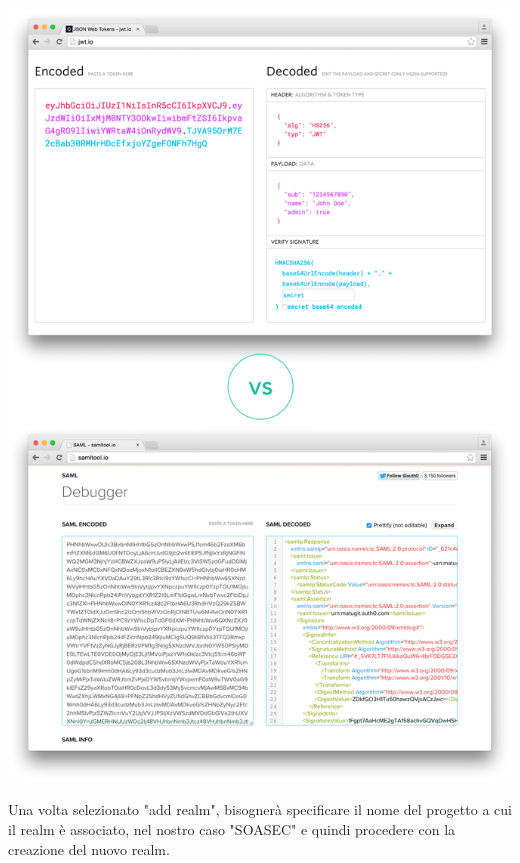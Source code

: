 \documentclass[twoside]{report}
\begin{document}
\begin{minipage}{\linewidth}
    \vspace{2mm}
    \centering
    \includegraphics[width= \linewidth]{3.png}
    \vspace{2mm}
\end{minipage}

Una volta selezionato "add realm", bisognerà specificare il nome del progetto a cui il realm è associato, nel nostro caso "SOASEC" e quindi procedere con la creazione del nuovo realm.
\end{document}
